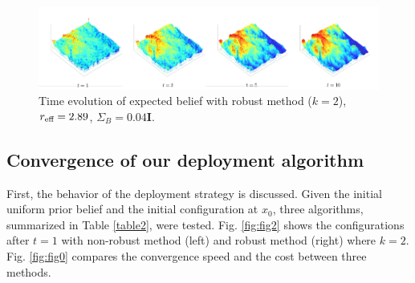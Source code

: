 \documentclass[letterpaper, 10 pt, conference]{ieeeconf}
\begin{document}
\begin{figure}
	 	\centering
		\includegraphics[width=6.5in]{figure/k_2_result}
	\caption{Time evolution of expected belief with robust method ($k=2$), $r_{\textup{eff}} = 2.89$, $\Sigma_B = 0.04\mathbf{I}$.}
	\label{fig:fig3}
\end{figure}

\subsection{Convergence of our deployment algorithm}
First, the behavior of the deployment strategy is discussed. Given the initial uniform prior belief and the initial configuration at $x_0$, three algorithms, summarized in Table \ref{table2}, were tested.
Fig. \ref{fig:fig2} shows the configurations after $t=1$ with non-robust method (left) and robust method (right) where $k=2$. 
Fig. \ref{fig:fig0} compares the convergence speed and the cost between three methods.
\end{document}
